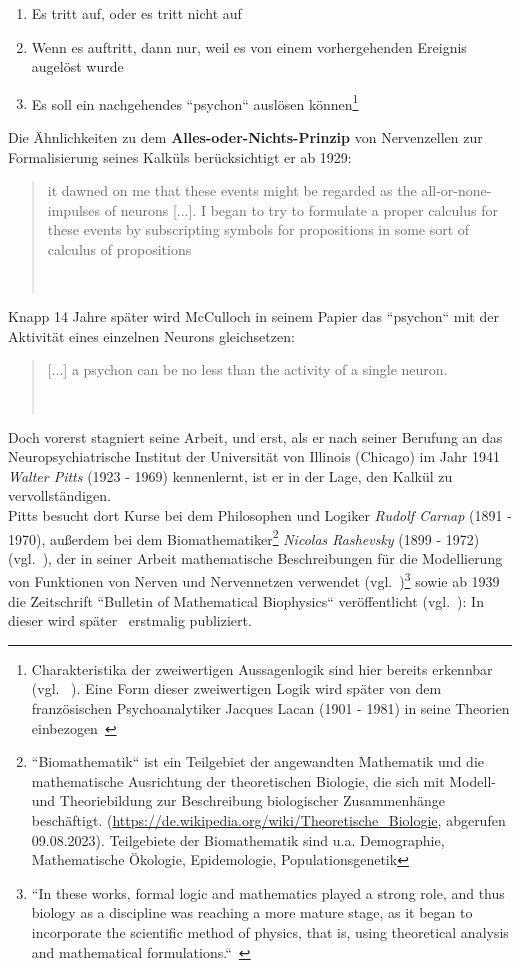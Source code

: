 \begin{enumerate}
    \item Es tritt auf, oder es tritt nicht auf
    \item Wenn es auftritt, dann nur, weil es von einem vorhergehenden Ereignis augelöst wurde
    \item Es soll ein nachgehendes ``psychon`` auslösen können\footnote{
        Charakteristika der zweiwertigen Aussagenlogik sind hier bereits erkennbar (vgl. ~\cite[7]{Abr02}). Eine Form dieser zweiwertigen Logik wird später von dem französischen Psychoanalytiker Jacques Lacan (1901 - 1981) in seine Theorien einbezogen~\cite[317]{Liu10}
    }
\end{enumerate}


Die Ähnlichkeiten zu dem \textbf{Alles-oder-Nichts-Prinzip} von Nervenzellen zur Formalisierung seines Kalküls berücksichtigt er ab 1929:

\blockquote[{~\cite[6]{Mcc16}}]{
    it dawned on me that these events might be regarded as the all-or-none-impulses of neurons [...]. I began to try to formulate a proper calculus for these events by subscripting symbols for propositions in some sort of calculus of propositions
}

Knapp 14 Jahre später wird McCulloch in seinem Papier das ``psychon`` mit der Aktivität eines einzelnen Neurons gleichsetzen:

\blockquote[{~\cite[114]{MP43}}]{
    [...] a psychon can be no less than the activity of a single neuron.
}

Doch vorerst stagniert seine Arbeit, und erst, als er nach seiner Berufung an das Neuropsychiatrische Institut der Universität von Illinois (Chicago) im Jahr 1941 \textit{Walter Pitts} (1923 - 1969) kennenlernt, ist er in der Lage, den Kalkül zu vervollständigen.\\

Pitts besucht dort Kurse bei dem Philosophen und Logiker \textit{Rudolf Carnap} (1891 - 1970), außerdem bei dem Biomathematiker\footnote{
    ``Biomathematik`` ist ein Teilgebiet der angewandten Mathematik und die mathematische Ausrichtung der theoretischen Biologie, die sich mit Modell- und Theoriebildung zur Beschreibung biologischer Zusammenhänge beschäftigt. ({\url{https://de.wikipedia.org/wiki/Theoretische\_Biologie}}, abgerufen 09.08.2023). Teilgebiete der Biomathematik sind u.a. Demographie, Mathematische Ökologie, Epidemologie, Populationsgenetik
} \textit{Nicolas Rashevsky} (1899 - 1972) (vgl.~\cite[184]{Pic04}), der in seiner Arbeit mathematische Beschreibungen für die Modellierung von Funktionen von Nerven und Nervennetzen verwendet (vgl.~\cite[13]{Abr02})\footnote{
    ``In these works, formal logic and mathematics played a strong role, and thus biology as a discipline was reaching a more mature stage, as it began to incorporate the scientific method of physics, that is, using theoretical analysis and mathematical formulations.``~\cite[7]{Abr02}
} sowie ab 1939 die Zeitschrift ``Bulletin of Mathematical Biophysics`` veröffentlicht (vgl.~\cite[16]{Abr02}): In dieser wird später~\cite{MP43} erstmalig publiziert.

